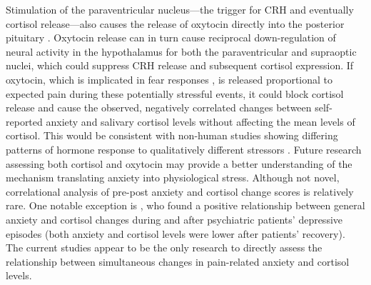 \documentclass[review]{elsarticle}\usepackage[]{graphicx}\usepackage[]{color}
\begin{document}
Stimulation of the paraventricular nucleus---the trigger for CRH and eventually cortisol release---also causes the release of oxytocin directly into the posterior pituitary \cite{ross2009characterization}.
Oxytocin release can in turn cause reciprocal down-regulation of neural activity in the hypothalamus for both the paraventricular and supraoptic nuclei, which could suppress CRH release and subsequent cortisol expression.
If oxytocin, which is implicated in fear responses \cite{guzman2013fear}, is released proportional to expected pain during these potentially stressful events, it could block cortisol release and cause the observed, negatively correlated changes between self-reported anxiety and salivary cortisol levels without affecting the mean levels of cortisol.
This would be consistent with non-human studies showing differing patterns of hormone response to qualitatively different stressors \cite{andersen2004different}.
Future research assessing both cortisol and oxytocin may provide a better understanding of the mechanism translating anxiety into physiological stress.
Although not novel, correlational analysis of pre-post anxiety and cortisol change scores is relatively rare.
One notable exception is \cite{sachar1970cortisol}, who found a positive relationship between general anxiety and cortisol changes during and after psychiatric patients' depressive episodes (both anxiety and cortisol levels were lower after patients' recovery).
The current studies appear to be the only research to directly assess the relationship between simultaneous changes in pain-related anxiety and cortisol levels.
\end{document}
